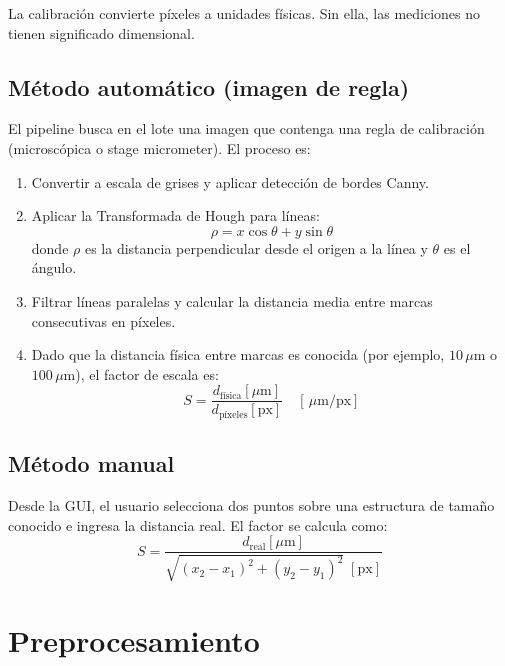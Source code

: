 \documentclass[11pt,a4paper]{article}
\newcommand{\um}{\,\mu\text{m}}
\newcommand{\umpx}{\,\mu\text{m/px}}
\begin{document}
La calibraci\'{o}n convierte p\'{i}xeles a unidades f\'{i}sicas. Sin ella, las mediciones no tienen significado dimensional.

\subsection{M\'{e}todo autom\'{a}tico (imagen de regla)}

El pipeline busca en el lote una imagen que contenga una regla de calibraci\'{o}n (microsc\'{o}pica o stage micrometer). El proceso es:

\begin{enumerate}
  \item Convertir a escala de grises y aplicar detecci\'{o}n de bordes Canny.
  \item Aplicar la Transformada de Hough para l\'{i}neas:
  \begin{equation}
    \rho = x \cos\theta + y \sin\theta
  \end{equation}
  donde $\rho$ es la distancia perpendicular desde el origen a la l\'{i}nea y $\theta$ es el \'{a}ngulo.
  \item Filtrar l\'{i}neas paralelas y calcular la distancia media entre marcas consecutivas en p\'{i}xeles.
  \item Dado que la distancia f\'{i}sica entre marcas es conocida (por ejemplo, $10\um$ o $100\um$), el factor de escala es:
  \begin{equation}
    S = \frac{d_{\text{f\'{i}sica}} [\mu\text{m}]}{d_{\text{p\'{i}xeles}} [\text{px}]} \quad [\umpx]
  \end{equation}
\end{enumerate}

\subsection{M\'{e}todo manual}

Desde la GUI, el usuario selecciona dos puntos sobre una estructura de tama\~{n}o conocido e ingresa la distancia real. El factor se calcula como:
\begin{equation}
  S = \frac{d_{\text{real}} [\mu\text{m}]}{\sqrt{(x_2 - x_1)^2 + (y_2 - y_1)^2} \; [\text{px}]}
\end{equation}

\section{Preprocesamiento}
\end{document}

